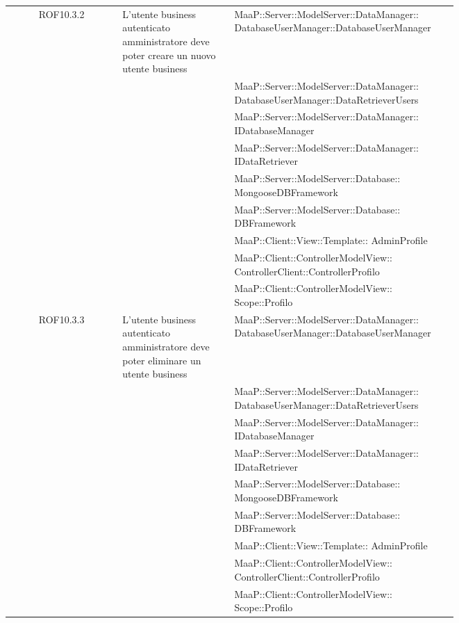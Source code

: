 \begin{center}
\begin{longtable}{|c|p{0.25\linewidth}|p{0.5\linewidth}|}
\midrule
ROF10.3.2
& L'utente business autenticato amministratore deve poter creare un nuovo utente business
& MaaP::Server::ModelServer::DataManager:: DatabaseUserManager::DatabaseUserManager\\
& & MaaP::Server::ModelServer::DataManager:: DatabaseUserManager::DataRetrieverUsers\\
& & MaaP::Server::ModelServer::DataManager:: IDatabaseManager\\
& & MaaP::Server::ModelServer::DataManager:: IDataRetriever\\
& & MaaP::Server::ModelServer::Database:: MongooseDBFramework\\
& & MaaP::Server::ModelServer::Database:: DBFramework\\
& & MaaP::Client::View::Template:: AdminProfile\\
& & MaaP::Client::ControllerModelView:: ControllerClient::ControllerProfilo\\
& & MaaP::Client::ControllerModelView:: Scope::Profilo\\

\midrule
ROF10.3.3
& L'utente business autenticato amministratore deve poter eliminare un utente business
& MaaP::Server::ModelServer::DataManager:: DatabaseUserManager::DatabaseUserManager\\
& & MaaP::Server::ModelServer::DataManager:: DatabaseUserManager::DataRetrieverUsers\\
& & MaaP::Server::ModelServer::DataManager:: IDatabaseManager\\
& & MaaP::Server::ModelServer::DataManager:: IDataRetriever\\
& & MaaP::Server::ModelServer::Database:: MongooseDBFramework\\
& & MaaP::Server::ModelServer::Database:: DBFramework\\
& & MaaP::Client::View::Template:: AdminProfile\\
& & MaaP::Client::ControllerModelView:: ControllerClient::ControllerProfilo\\
& & MaaP::Client::ControllerModelView:: Scope::Profilo\\


\end{longtable}
\end{center}
